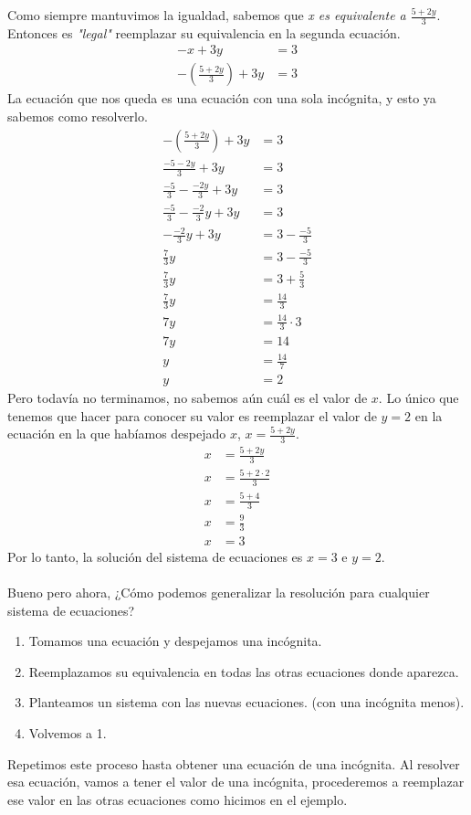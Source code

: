 \documentclass{article}
\begin{document}
\begin{normalsize}
Como siempre mantuvimos la igualdad, sabemos que \textit{x es equivalente a $\frac{5+2y}{3}$}. Entonces es \textit{"legal"} reemplazar su equivalencia en la segunda ecuación.
	\begin{align}
	-x+3y&=3\nonumber\\
	-(\frac{5+2y}{3})+3y&=3\nonumber
	\end{align}
La ecuación que nos queda es una ecuación con una sola incógnita, y esto ya sabemos como resolverlo.
	\begin{align}
	-(\frac{5+2y}{3})+3y&=3\nonumber\\
	\frac{-5-2y}{3}+3y&=3\nonumber\\
	\frac{-5}{3}-\frac{-2y}{3}+3y&=3\nonumber\\
	\frac{-5}{3}-\frac{-2}{3}y+3y&=3\nonumber\\
	-\frac{-2}{3}y+3y&=3-\frac{-5}{3}\nonumber\\
	\frac{7}{3}y&=3-\frac{-5}{3}\nonumber\\
	\frac{7}{3}y&=3+\frac{5}{3}\nonumber\\
	\frac{7}{3}y&=\frac{14}{3}\nonumber\\
	7y&=\frac{14}{3}\cdot3\nonumber\\
	7y&=14\nonumber\\
	y&=\frac{14}{7}\nonumber\\
	y&=2\nonumber
	\end{align}
Pero todavía no terminamos, no sabemos aún cuál es el valor de $x$. Lo único que tenemos que hacer para conocer su valor es reemplazar el valor de $y=2$ en la ecuación en la que habíamos despejado $x$, $x=\frac{5+2y}{3}$.
	\begin{align}
	x&=\frac{5+2y}{3}\nonumber\\
	x&=\frac{5+2\cdot2}{3}\nonumber\\
	x&=\frac{5+4}{3}\nonumber\\
	x&=\frac{9}{3}\nonumber\\
	x&=3\nonumber
	\end{align}
Por lo tanto, la solución del sistema de ecuaciones es $x=3$ e $y=2$.
\\\\
Bueno pero ahora, ¿Cómo podemos generalizar la resolución para cualquier sistema de ecuaciones?

\begin{enumerate}
	\item Tomamos una ecuación y despejamos una incógnita.
	\item Reemplazamos su equivalencia en todas las otras ecuaciones donde aparezca.
	\item Planteamos un sistema con las nuevas ecuaciones. (con una incógnita menos).
	\item Volvemos a 1.\\
\end{enumerate}
Repetimos este proceso hasta obtener una ecuación de una incógnita. Al resolver esa ecuación, vamos a tener el valor de una incógnita, procederemos a reemplazar ese valor en las otras ecuaciones como hicimos en el ejemplo.\\
\end{normalsize}
\end{document}
